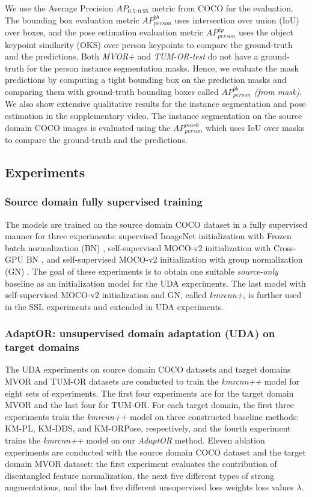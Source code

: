 We use the Average Precision \emph{$AP_{0.5:0.95}$} metric from COCO \citep{lin2014microsoft} for the evaluation. The bounding box evaluation metric \emph{$AP_{person}^{bb}$} uses intersection over union (IoU) over boxes, and the pose estimation evaluation metric \emph{$AP_{person}^{kp}$} uses the object keypoint similarity (OKS) over person keypoints to compare the ground-truth and the predictions. Both \emph{MVOR+} and \emph{TUM-OR-test} do not have a ground-truth for the person instance segmentation masks. Hence, we evaluate the mask predictions by computing a tight bounding box on the prediction masks and comparing them with ground-truth bounding boxes called \emph{$AP_{person}^{bb}$ (from mask)}. We also show extensive qualitative results for the instance segmentation and pose estimation in the supplementary video. The instance segmentation on the source domain COCO images is evaluated using the \emph{$AP_{person}^{mask}$} which uses IoU over masks to compare the ground-truth and the predictions.

\subsection{Experiments}
\subsubsection{Source domain fully supervised training} \label{sdfs}
The models are trained on the source domain COCO dataset in a fully supervised manner for three experiments: supervised ImageNet initialization with Frozen batch normalization (BN) \citep{he2016deep}, self-supervised MOCO-v2 initialization \citep{chen2020simple,he2020momentum} with Cross-GPU BN \citep{peng2018megdet}, and self-supervised MOCO-v2 initialization \citep{chen2020simple,he2020momentum} with group normalization (GN) \citep{wu2018group}. The goal of these experiments is to obtain one suitable \emph{source-only} baseline as an initialization model for the UDA experiments. The last model with self-supervised MOCO-v2 initialization and GN, called \emph{kmrcnn+}, is further used in the SSL experiments and extended in UDA experiments.
\subsubsection{AdaptOR: unsupervised domain adaptation (UDA) on target domains} \label{stduda}
The UDA experiments on source domain COCO datasets and target domains MVOR and TUM-OR datasets are conducted to train the \emph{kmrcnn++} model for eight sets of experiments. The first four experiments are for the target domain MVOR and the last four for TUM-OR. For each target domain, the first three experiments train the \emph{kmrcnn++} model on three constructed baseline methods: KM-PL, KM-DDS, and KM-ORPose, respectively, and the fourth experiment trains the \emph{kmrcnn++} model on our \emph{AdaptOR} method. Eleven ablation experiments are conducted with the source domain COCO dataset and the target domain MVOR dataset: the first experiment evaluates the contribution of disentangled feature normalization, the next five different types of strong augmentations, and the {\blue last five different unsupervised loss weights loss values $\lambda$}.
